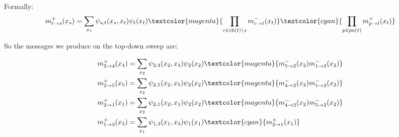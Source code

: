 \documentclass{harvardml}
\theoremstyle{definition}
\theoremstyle{plain}
\theoremstyle{definition}
\theoremstyle{remark}
\begin{document}
\begin{itemize}
Formally:
$$m_{t \rightarrow s}^{+} (x_s) = \sum_{x_t}\psi_{s,t}(x_s,x_t)\psi_t(x_t) 
\textcolor{magenta}{\prod_{c \in \text{ch}(t)\setminus s} m_{c \rightarrow t}^{-}(x_t)} \textcolor{cyan}{\prod_{p \in pa(t)} m_{p \rightarrow t}^{+}(x_t)}$$

So the messages we produce on the top-down sweep are:

\begin{align*}
    m_{2 \rightarrow 4}^{+} (x_4) &= \sum_{x_2} \psi_{2,4}(x_2,x_4)\psi_2(x_2) \textcolor{magenta}{m_{5 \rightarrow 2}^{-}(x_2)  m_{1 \rightarrow 2}^{-}(x_2)}\\ %
    m_{2 \rightarrow 5}^{+} (x_5) &= \sum_{x_2} \psi_{2,5}(x_2,x_5)\psi_2(x_2) \textcolor{magenta}{m_{4 \rightarrow 2}^{-}(x_2)  m_{1 \rightarrow 2}^{-}(x_2)}\\
    m_{2 \rightarrow 1}^{+} (x_1) &= \sum_{x_2} \psi_{2,1}(x_2,x_1)\psi_2(x_2) \textcolor{magenta}{m_{4 \rightarrow 2}^{-}(x_2)  m_{5 \rightarrow 2}^{-}(x_2)}\\
    m_{1 \rightarrow 3}^{+} (x_3) &= \sum_{x_1} \psi_{1,3}(x_1,x_3)\psi_1(x_1) \textcolor{cyan}{m_{2 \rightarrow 1}^{+}(x_1)}\\
\end{align*}
\end{itemize}
\medskip 
\end{document}
